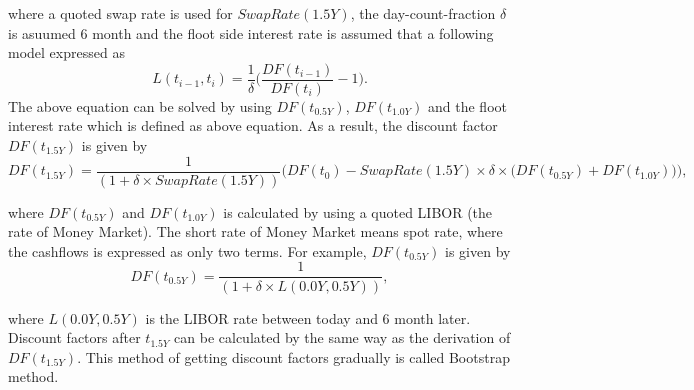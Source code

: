 \documentclass[11pt]{article}
\begin{document}
where a quoted swap rate is used for \(SwapRate(1.5Y)\), the
day-count-fraction \(\delta\) is asuumed 6 month and the floot side
interest rate is assumed that a following model expressed as \[
L(t_{i-1}, t_{i}) = \frac{1}{\delta} \Big( \frac{ DF(t_{i-1}) }{ DF(t_{i}) } - 1 \Big).
\] The above equation can be solved by using \(DF(t_{0.5Y})\),
\(DF(t_{1.0Y})\) and the floot interest rate which is defined as above
equation. As a result, the discount factor \(DF(t_{1.5Y})\) is given by
\[
DF(t_{1.5Y}) = \frac{1}{(1 + \delta \times SwapRate(1.5Y))} \Big( DF(t_{0}) - SwapRate(1.5Y) \times \delta \times \big(DF(t_{0.5Y}) + DF(t_{1.0Y}) \big) \Big),
\]

where \(DF(t_{0.5Y})\) and \(DF(t_{1.0Y})\) is calculated by using a
quoted LIBOR (the rate of Money Market). The short rate of Money Market
means spot rate, where the cashflows is expressed as only two terms. For
example, \(DF(t_{0.5Y})\) is given by \[
DF(t_{0.5Y}) = \frac{1}{( 1 + \delta \times L(0.0Y, 0.5Y))},
\]

where \(L(0.0Y, 0.5Y)\) is the LIBOR rate between today and 6 month
later. Discount factors after \(t_{1.5Y}\) can be calculated by the same
way as the derivation of \(DF(t_{1.5Y})\). This method of getting
discount factors gradually is called Bootstrap method.

\href{Continuously,\%20let\%20us\%20consider\%20a\%20T/N\%20swap\%20trade.\%20When\%20$V\%20=\%200$\%20under\%20the\%20swap\%20pricing\%20formula,\%20it\%20is\%20written\%20by\%20$$\%20FixedRate(T/N)\%20(\%20DF(t_\%7BO/N\%7D)\%20/times\%20/delta_\%7B1\%7D\%20+\%20DF(t_\%7BT/N\%7D)\%20/times\%20/delta_\%7B2\%7D\%20)\%20/\%20=\%20(\%20DF(t_\%7BO/N\%7D)\%20-\%20DF(t_\%7B0\%7D)\%20)\%20/delta_\%7B1\%7D\%20+\%20(DF(t_\%7BT/N\%7D)\%20-\%20DF(t_\%7BO/N\%7D))\%20/delta_\%7B2\%7D,\%20$$\%20where\%20$/delta_2$\%20is\%20a\%20day-count-fraction\%20between\%20$t_\%7BO/N\%7D$\%20and\%20$t_\%7BT/N\%7D$\%20and\%20a\%20quoted\%20Tomorrow-Next\%20Rate\%20is\%20used\%20for\%20$FixedRate(T/N)$.\%20This\%20equation\%20can\%20be\%20solved\%20for\%20$DF(t_\%7BT/N\%7D)$\%20by\%20using\%20$DF(t_\%7BO/N\%7D)$\%20which\%20is\%20derived\%20from\%20the\%20above\%20equation.\%20In\%20this\%20way,\%20discount\%20factors\%20at\%20each\%20tenor\%20is\%20calculated.\%20This\%20method\%20for\%20getiing\%20discount\%20factors\%20is\%20called\%20as\%20Bootstrap\%20method.\%20The\%20expression\%20of\%20$DF(t_\%7BT/N\%7D)$\%20is\%20given\%20by\%20$$\%20DF(t_\%7BT/N\%7D)\%20=\%20/frac\%7B\%20FixedRate(T/N)/times\%20DF(t_\%7BO/N\%7D)\%20+\%20DF(t_0)\%20\%7D\%7B\%201\%20-\%20FixedRate(T/N)\%20\%7D\%20$$}{}
\end{document}
